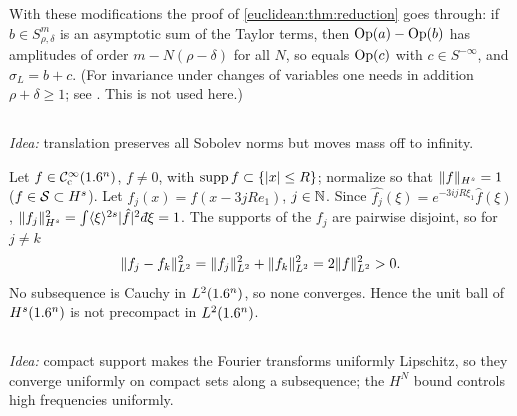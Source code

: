 With these modifications the proof of \cref{euclidean:thm:reduction} goes through: if
$b\in S^m_{\rho,\delta}$ is an asymptotic sum of the Taylor terms, then
$\operatorname{Op}(a)-\operatorname{Op}(b)$ has amplitudes of order $m-N(\rho-\delta)$ for all $N$, so equals
$\operatorname{Op}(c)$ with $c\in S^{-\infty}$, and $\sigma_L=b+c$. (For invariance under changes of
variables one needs in addition $\rho+\delta\ge1$; see \cite[Section~18.1]{Hormander-III}.
This is not used here.)

\subsection*{}

\emph{Idea:} translation preserves all Sobolev norms but moves mass off to infinity.

Let $f\in\mathcal{C}^\infty_{\mathrm{c}}(1.6^n)$, $f\ne0$, with $\operatorname{supp} f\subset\{\lvert x\rvert\le R\}$; normalize so that
$\lVert f\rVert_{H^s}=1$ ($f\in\mathcal{S}\subset H^s$). Let $f_j(x)=f(x-3jRe_1)$, $j\in\mathbb{N}$. Since
$\widehat{f_j}(\xi)=e^{-3ijR\xi_1}\hat f(\xi)$,
$\norm{f_j}_{H^s}^2=\int\ang\xi^{2s}\abs{\hat f}^2\,\dbar\xi=1$. The supports of the $f_j$
are pairwise disjoint, so for $j\ne k$
\begin{equation*}
  \lVert f_j-f_k\rVert_{L^2}^2=\lVert f_j\rVert_{L^2}^2+\lVert f_k\rVert_{L^2}^2=2\lVert f\rVert_{L^2}^2>0.
\end{equation*}
No subsequence is Cauchy in $L^2(1.6^n)$, so none converges. Hence the unit ball of
$H^s(1.6^n)$ is not precompact in $L^2(1.6^n)$.

\subsection*{}

\emph{Idea:} compact support makes the Fourier transforms uniformly Lipschitz, so they
converge uniformly on compact sets along a subsequence; the $H^N$ bound controls high
frequencies uniformly.

